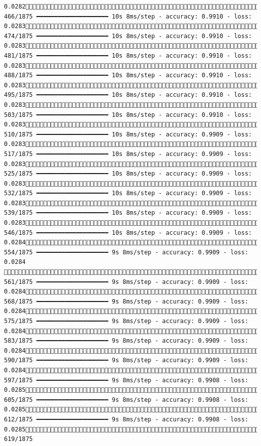 \documentclass[
  letterpaper,
  DIV=11,
  numbers=noendperiod]{scrreprt}
\begin{document}
\begin{verbatim}
0.0282 466/1875 ━━━━━━━━━━━━━━━━━━━━ 10s 8ms/step - accuracy: 0.9910 - loss: 0.0283 474/1875 ━━━━━━━━━━━━━━━━━━━━ 10s 8ms/step - accuracy: 0.9910 - loss: 0.0283 481/1875 ━━━━━━━━━━━━━━━━━━━━ 10s 8ms/step - accuracy: 0.9910 - loss: 0.0283 488/1875 ━━━━━━━━━━━━━━━━━━━━ 10s 8ms/step - accuracy: 0.9910 - loss: 0.0283 495/1875 ━━━━━━━━━━━━━━━━━━━━ 10s 8ms/step - accuracy: 0.9910 - loss: 0.0283 503/1875 ━━━━━━━━━━━━━━━━━━━━ 10s 8ms/step - accuracy: 0.9910 - loss: 0.0283 510/1875 ━━━━━━━━━━━━━━━━━━━━ 10s 8ms/step - accuracy: 0.9909 - loss: 0.0283 517/1875 ━━━━━━━━━━━━━━━━━━━━ 10s 8ms/step - accuracy: 0.9909 - loss: 0.0283 525/1875 ━━━━━━━━━━━━━━━━━━━━ 10s 8ms/step - accuracy: 0.9909 - loss: 0.0283 532/1875 ━━━━━━━━━━━━━━━━━━━━ 10s 8ms/step - accuracy: 0.9909 - loss: 0.0283 539/1875 ━━━━━━━━━━━━━━━━━━━━ 10s 8ms/step - accuracy: 0.9909 - loss: 0.0283 546/1875 ━━━━━━━━━━━━━━━━━━━━ 10s 8ms/step - accuracy: 0.9909 - loss: 0.0284 554/1875 ━━━━━━━━━━━━━━━━━━━━ 9s 8ms/step - accuracy: 0.9909 - loss: 0.0284  561/1875 ━━━━━━━━━━━━━━━━━━━━ 9s 8ms/step - accuracy: 0.9909 - loss: 0.0284 568/1875 ━━━━━━━━━━━━━━━━━━━━ 9s 8ms/step - accuracy: 0.9909 - loss: 0.0284 575/1875 ━━━━━━━━━━━━━━━━━━━━ 9s 8ms/step - accuracy: 0.9909 - loss: 0.0284 583/1875 ━━━━━━━━━━━━━━━━━━━━ 9s 8ms/step - accuracy: 0.9909 - loss: 0.0284 590/1875 ━━━━━━━━━━━━━━━━━━━━ 9s 8ms/step - accuracy: 0.9909 - loss: 0.0284 597/1875 ━━━━━━━━━━━━━━━━━━━━ 9s 8ms/step - accuracy: 0.9908 - loss: 0.0285 605/1875 ━━━━━━━━━━━━━━━━━━━━ 9s 8ms/step - accuracy: 0.9908 - loss: 0.0285 612/1875 ━━━━━━━━━━━━━━━━━━━━ 9s 8ms/step - accuracy: 0.9908 - loss: 0.0285 619/1875 
\end{verbatim}
\end{document}
